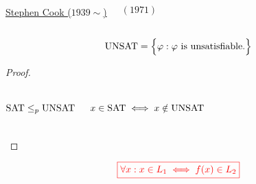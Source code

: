 \begin{frame}
  \begin{center}
  \end{center}

  \begin{columns}
	  \begin{center}
		\href{https://en.wikipedia.org/wiki/Stephen\_Cook}{Stephen Cook ($1939 \sim$)}
	  \end{center}
	  \begin{center}
		\href{http://www.cs.toronto.edu/~sacook/homepage/1971.pdf}{$(1971)$}
	  \end{center}
  \end{columns}
\end{frame}

\begin{frame}
  \[
	\text{UNSAT} = \Big\{ \varphi: \varphi \text{ is unsatisfiable.} \Big\}
  \]

  \begin{center}
  \end{center}

  \pause
  \begin{proof}
	\begin{columns}
		\pause
		\[
		  \text{SAT} \le_{p} \text{UNSAT}
		\]

		\pause
		\[
		  x \in \text{SAT} \iff x \notin \text{UNSAT}
		\]
		\pause
	\end{columns}
  \end{proof}

  \pause
  \[
	\textcolor{red}{\boxed{\forall x: x \in L_1 \iff f(x) \in L_2}}
  \]
\end{frame}

% 
